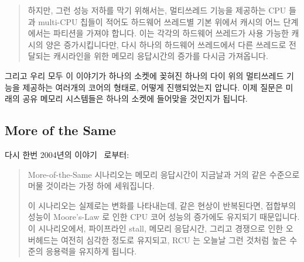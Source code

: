 \begin{quote}
	하지만, 그런 성능 저하를 막기 위해서는, 멀티쓰레드 기능을 제공하는 CPU
	들과 multi-CPU 칩들이 적어도 하드웨어 쓰레드별 기본 위에서 캐시의 어느
	단계에서는 파티션을 가져야 합니다.
	이는 각각의 하드웨어 쓰레드가 사용 가능한 캐시의 양은 증가시킵니다만,
	다시 하나의 하드웨어 쓰레드에서 다른 쓰레드로 전달되는 캐시라인을 위한
	메모리 응답시간의 증가를 다시금 가져옵니다.

\end{quote}

그리고 우리 모두 이 이야기가 하나의 소켓에 꽂혀진 하나의 다이 위의 멀티쓰레드
기능을 제공하는 여러개의 코어의 형태로, 어떻게 진행되었는지 압니다.
이제 질문은 미래의 공유 메모리 시스템들은 하나의 소켓에 들어맞을 것인지가
됩니다.

\subsection{More of the Same}
\label{sec:meas:More of the Same}

다시 한번 2004년의 이야기~\cite{PaulEdwardMcKenneyPhD} 로부터:

\begin{quote}
	More-of-the-Same 시나리오는 메모리 응답시간이 지금날과 거의 같은
	수준으로 머물 것이라는 가정 하에 세워집니다.

	이 시나리오는 실제로는 변화를 나타내는데, 같은 현상이 반복된다면,
	접합부의 성능이 Moore's-Law 로 인한 CPU 코어 성능의 증가에도 유지되기
	때문입니다.
	이 시나리오에서, 파이프라인 stall, 메모리 응답시간, 그리고 경쟁으로
	인한 오버헤드는 여전히 심각한 정도로 유지되고, RCU 는 오늘날 그런
	것처럼 높은 수준의 응용력을 유지하게 됩니다.

\end{quote}

